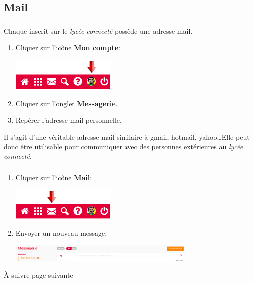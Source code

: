 \documentclass[svgnames,11pt]{beamer}
\begin{document}
\subsection{Mail}
\begin{frame}
    \frametitle{}

    Chaque inscrit sur le \emph{lycée connecté} possède une adresse mail.
    \begin{activite}
    \begin{enumerate}
        \item Cliquer sur l'icône \textbf{Mon compte}:
        \begin{center}
        \centering
        \includegraphics[width=5cm]{ressources/bandeaucompte.png}
        \end{center}
        \item Cliquer sur l'onglet \textbf{Messagerie}.
        \item Repérer l'adresse mail personnelle.
    \end{enumerate}
    \end{activite}

\begin{aretenir}[Remarque]
Il s'agit d'une véritable adresse mail similaire à gmail, hotmail, yahoo\dots Elle peut donc être utilisable pour communiquer avec des personnes extérieures au \emph{lycée connecté}.
\end{aretenir}

\end{frame}
\begin{frame}
    \frametitle{}

    \begin{activite}
    \begin{enumerate}
        \item Cliquer sur l'icône \textbf{Mail}:
        \begin{center}
        \centering
        \includegraphics[width=5cm]{ressources/bandeauappmail.png}
        \end{center}
        \item Envoyer un nouveau message:
        \begin{center}
            \centering
            \includegraphics[width=9cm]{ressources/nouveaumessage.png}
            \end{center}

    \end{enumerate}

    \end{activite}
\begin{center}
    À suivre page suivante
\end{center}
\end{frame}
\end{document}
